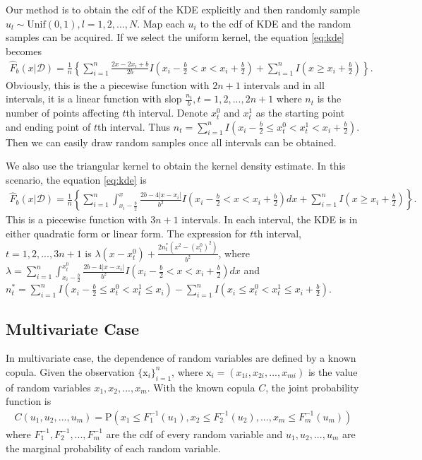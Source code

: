 \documentclass[letterpaper,12pt,hidelinks]{article}
\begin{document}
Our method is to obtain the cdf of the KDE explicitly and then randomly sample $u_l \sim \text{Unif}(0,1), l = 1, 2, ... ,N$. Map each $u_i$ to the cdf of KDE and the random samples can be acquired. If we select the uniform kernel, the equation \ref{eq:kde} becomes
\begin{align}\label{eq:kde_uni}
\hat{F}_b(x|\mathcal{D}) = \frac{1}{n}\left\{\sum_{i=1}^n\frac{2x-2x_i+b}{2b} I\left(x_i-\frac{b}{2} < x< x_i + \frac{b}{2}\right) + \sum_{i=1}^n I\left(x \ge x_i + \frac{b}{2}\right) \right\}.
\end{align}
Obviously, this is the a piecewise function with $2n + 1$ intervals and in all intervals, it is a linear function with slop $\frac{n_t}{b}, t = 1,2,...,2n+1$ where $n_t$ is the number of points affecting $t$th interval. Denote $x_t^0$ and $x_t^1$ as the starting point and ending point of $t$th interval. Thus $n_t = \sum_{i=1}^n I(x_i - \frac{b}{2} \le x_t^0 < x_t^1 < x_i + \frac{b}{2})$. Then we can easily draw random samples once all intervals can be obtained. 

We also use the triangular kernel to obtain the kernel density estimate. In this scenario, the equation \ref{eq:kde} is
\begin{align*}
\hat{F}_b(x|\mathcal{D}) = \frac{1}{n} \left\{ \sum_{i=1}^n \int_{x_i - \frac{b}{2}}^x \frac{2b - 4|x-x_i|}{b^2} I\left(x_i-\frac{b}{2} < x< x_i + \frac{b}{2}\right) dx + \sum_{i=1}^n I\left(x \ge x_i + \frac{b}{2}\right) \right\}.
\end{align*}
This is a piecewise function with $3n + 1$ intervals. In each interval, the KDE is in either quadratic form or linear form. The expression for $t$th interval, $t = 1,2, ..., 3n+1$ is $\lambda(x - x_t^0) + \frac{2n_t^*(x^2 - (x_t^0)^2)}{b^2}$, where $\lambda = \sum_{i=1}^n \int_{x_i - \frac{b}{2}}^{x_t^0} \frac{2b - 4|x-x_i|}{b^2} I\left(x_i-\frac{b}{2} < x< x_i + \frac{b}{2}\right) dx$ and $n_t^* = \sum_{i=1}^n I\left(x_i-\frac{b}{2} \le x_t^0 < x_t^1\le x_i \right) - \sum_{i=1}^n I\left(x_i \le x_t^0 < x_t^1 \le x_i + \frac{b}{2} \right)$.



\subsection{Multivariate Case}

In multivariate case, the dependence of random variables are defined by a known copula. Given the observation $\{\bm{\mathrm{x}}_i\}_{i=1}^n$, where $\bm{\mathrm{x}}_i = (x_{1i}, x_{2i}, ..., x_{mi})$ is the value of random variables $x_1, x_2,...,x_m$. With the known copula $C$, the joint probability function is
\begin{align*}
C(u_{1}, u_{2}, ..., u_{m}) = \mathrm{P}(x_{1} \le F_1^{-1}(u_{1}), x_{2} \le F_2^{-1}(u_{2}), ..., x_{m} \le F_m^{-1}(u_{m}))
\end{align*}
where $F_1^{-1},  F_2^{-1}, ..., F_m^{-1}$ are the cdf of every random variable and $u_{1}, u_{2}, ..., u_{m}$ are the marginal probability of each random variable. 
\end{document}

